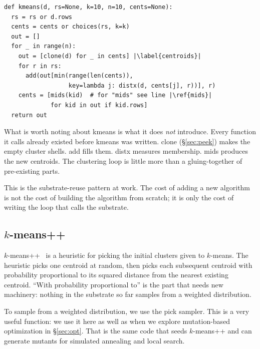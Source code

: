 \documentclass[AMA,STIX2COL]{WileyNJDv5}
\begin{document}
\begin{verbatim}
def kmeans(d, rs=None, k=10, n=10, cents=None):
  rs = rs or d.rows
  cents = cents or choices(rs, k=k)
  out = []
  for _ in range(n):
    out = [clone(d) for _ in cents] |\label{centroids}|
    for r in rs:
      add(out[min(range(len(cents)),
                  key=lambda j: distx(d, cents[j], r))], r)
    cents = [mids(kid)  # for "mids" see line |\ref{mids}|
             for kid in out if kid.rows]
  return out
\end{verbatim}
What is worth noting about \textsf{kmeans} is what it does
\emph{not} introduce. Every function it calls already existed
before \textsf{kmeans} was written. \textsf{clone}
(\S\ref{sec:peek}) makes the empty cluster shells. \textsf{add}
fills them. \textsf{distx} measures membership. \textsf{mids}
produces the new centroids. The clustering loop is little
more than a gluing-together of pre-existing parts.

This is the substrate-reuse pattern at work. The cost of
adding a new algorithm is not the cost of building the
algorithm from scratch; it is only the cost of writing the
loop that calls the substrate.

\subsection{$k$-means++}

$k$-means++~\cite{arthur2007kmeanspp} is a heuristic for picking
the initial clusters given to $k$-means. The heuristic picks one
centroid at random, then picks each subsequent centroid with
probability proportional to its squared distance from the
nearest existing centroid. ``With probability proportional to''
is the part that needs new machinery: nothing in the substrate
so far samples from a weighted distribution.

To sample from a weighted distribution, we use the  
\textsf{pick} sampler. This is a very useful function: we use 
it here as well as when we explore
mutation-based optimization in \S\ref{sec:opt}.
That is  the same code that seeds $k$-means++ and can 
generate mutants for simulated annealing and local search. 
\end{document}
